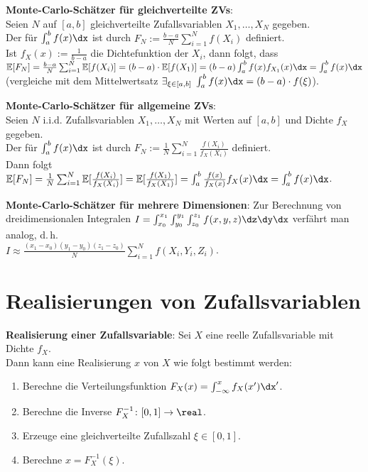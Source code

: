 \linie

\textbf{Monte-Carlo-Schätzer für gleichverteilte ZVs}:\\
Seien $N$ auf $[a, b]$ gleichverteilte Zufallsvariablen $X_1, \dotsc, X_N$ gegeben.\\
Der  für $\int_a^b f(x) \dx$ ist durch
$F_N := \frac{b - a}{N} \sum_{i=1}^N f(X_i)$ definiert.\\
Ist $f_X(x) := \frac{1}{b-a}$ die Dichtefunktion der $X_i$, dann folgt, dass\\
$\EE[F_N] = \frac{b - a}{N} \sum_{i=1}^N \EE[f(X_i)]
= (b-a) \cdot \EE[f(X_1)] = (b-a) \int_a^b f(x)f_{X_1}(x) \dx = \int_a^b f(x) \dx$\\
(vergleiche mit dem Mittelwertsatz
$\exists_{\xi \in [a, b]}\; \int_a^b f(x) \dx = (b-a) \cdot f(\xi)$).

\textbf{Monte-Carlo-Schätzer für allgemeine ZVs}:\\
Seien $N$ i.i.d. Zufallsvariablen $X_1, \dotsc, X_N$ mit Werten auf $[a, b]$ und
Dichte $f_X$ gegeben.\\
Der  für $\int_a^b f(x) \dx$ ist durch
$F_N := \frac{1}{N} \sum_{i=1}^N \frac{f(X_i)}{f_X(X_i)}$ definiert.\\
Dann folgt
$\EE[F_N] = \frac{1}{N} \sum_{i=1}^N \EE[\frac{f(X_i)}{f_X(X_i)}]
= \EE[\frac{f(X_1)}{f_X(X_1)}] = \int_a^b \frac{f(x)}{f_X(x)} f_X(x) \dx = \int_a^b f(x) \dx$.

\linie

\textbf{Monte-Carlo-Schätzer für mehrere Dimensionen}:
Zur Berechnung von dreidimensionalen Integralen
$I = \int_{x_0}^{x_1} \int_{y_0}^{y_1} \int_{z_0}^{z_1} f(x, y, z) \dz\dy\dx$
verfährt man analog, d.\,h.\\
$I \approx \frac{(x_1 - x_0) (y_1 - y_0) (z_1 - z_0)}{N} \sum_{i=1}^N f(X_i, Y_i, Z_i)$.

\pagebreak

\section{%
    Realisierungen von Zufallsvariablen%
}

\textbf{Realisierung einer Zufallsvariable}:
Sei $X$ eine reelle Zufallsvariable mit Dichte $f_X$.\\
Dann kann eine Realisierung $x$ von $X$ wie folgt bestimmt werden:
\begin{enumerate}
    \item
    Berechne die Verteilungsfunktion $F_X(x) = \int_{-\infty}^x f_X(x') \dx'$.

    \item
    Berechne die Inverse $F_X^{-1}\colon [0, 1] \to \real$.

    \item
    Erzeuge eine gleichverteilte Zufallszahl $\xi \in [0, 1]$.

    \item
    Berechne $x = F_X^{-1}(\xi)$.
\end{enumerate}


